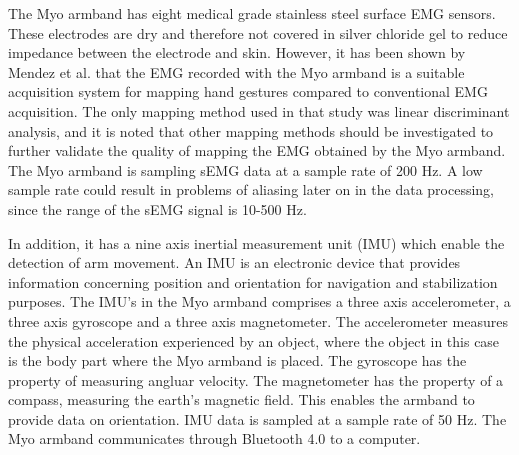 The Myo armband has eight medical grade stainless steel surface EMG sensors. %
These electrodes are dry and therefore not covered in silver chloride gel to reduce impedance between the electrode and skin. However, it has been shown by Mendez et al. \cite{Mendez2017} that the EMG recorded with the Myo armband is a suitable acquisition system for mapping hand gestures compared to conventional EMG acquisition. The only mapping method used in that study was linear discriminant analysis, and it is noted that other mapping methods should be investigated to further validate the quality of mapping the EMG obtained by the Myo armband. The Myo armband is sampling sEMG data at a sample rate of 200 Hz. A low sample rate could result in problems of aliasing later on in the data processing, since the range of the sEMG signal is 10-500 Hz. \cite{cram2012} 

In addition, it has a nine axis inertial measurement unit (IMU) which enable the detection of arm movement. An IMU is an electronic device that provides information concerning position and orientation for navigation and stabilization purposes. The IMU's in the Myo armband comprises a three axis accelerometer, a three axis gyroscope and a three axis magnetometer. The accelerometer measures the physical acceleration experienced by an object, where the object in this case is the body part where the Myo armband is placed. 
The gyroscope has the property of measuring angluar velocity. The magnetometer has the property of a compass, measuring the earth's magnetic field. This enables the armband to provide data on orientation. IMU data is sampled at a sample rate of 50 Hz. The Myo armband communicates through Bluetooth 4.0 to a computer.


